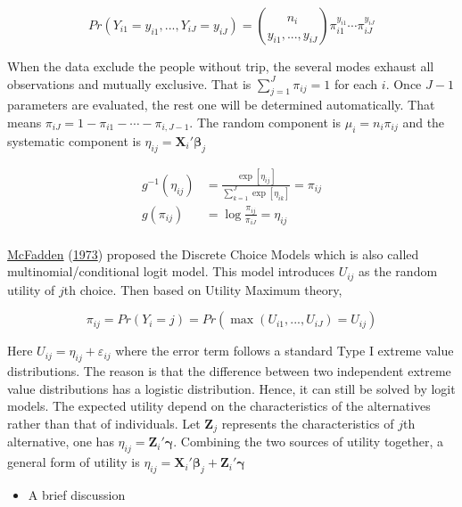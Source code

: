 \documentclass[
  11pt,
  openany]{memoir}
\providecommand{\tightlist}{%
  \setlength{\itemsep}{0pt}\setlength{\parskip}{0pt}}
\begin{document}
\begin{equation}
Pr(Y_{i1}=y_{i1}, ..., Y_{iJ}=y_{iJ})= {n_i \choose y_{i1},..., y_{iJ} }
\pi_{i1}^{y_{i1}} \cdots \pi_{iJ}^{y_{iJ}}
\end{equation}

When the data exclude the people without trip, the several modes exhaust all observations and mutually exclusive. That is \(\sum_{j=1}^J\pi_{ij}=1\) for each \(i\). Once \(J-1\) parameters are evaluated, the rest one will be determined automatically. That means \(\pi_{iJ}=1-\pi_{i1}-\cdots-\pi_{i,J-1}\).
The random component is \(\mu_i=n_i\pi_{ij}\) and the systematic component is \(\eta_{ij}=\mathbf{X}_i'\boldsymbol\beta_j\)

\begin{equation}
\begin{split}
g^{-1}(\eta_{ij})&=\frac{\exp[\eta_{ij}]}{\sum_{k=1}^J\exp[\eta_{ik}]}=\pi_{ij}\\
g(\pi_{ij})&=\log\frac{\pi_{ij}}{\pi_{iJ}}=\eta_{ij}\\
\end{split}
\label{eq:mlogit-link}
\end{equation}

\protect\hyperlink{ref-mcfaddenConditionalLogitAnalysis1973}{McFadden} (\protect\hyperlink{ref-mcfaddenConditionalLogitAnalysis1973}{1973}) proposed the Discrete Choice Models which is also called multinomial/conditional logit model.
This model introduces \(U_{ij}\) as the random utility of \(j\)th choice. Then based on Utility Maximum theory,

\begin{equation}
\pi_{ij}=Pr(Y_i=j)=Pr(\max(U_{i1},...,U_{iJ})=U_{ij})
\end{equation}

Here \(U_{ij}=\eta_{ij}+\varepsilon_{ij}\) where the error term follows a standard Type I extreme value distributions. The reason is that the difference between two independent extreme value distributions has a logistic distribution. Hence, it can still be solved by logit models.
The expected utility depend on the characteristics of the alternatives rather than that of individuals.
Let \(\mathbf{Z}_j\) represents the characteristics of \(j\)th alternative, one has \(\eta_{ij}=\mathbf{Z}_i'\boldsymbol\gamma\).
Combining the two sources of utility together, a general form of utility is \(\eta_{ij}=\mathbf{X}_i'\boldsymbol\beta_j+\mathbf{Z}_i'\boldsymbol\gamma\)

\begin{itemize}
\tightlist
\item
  A brief discussion
\end{itemize}
\end{document}
